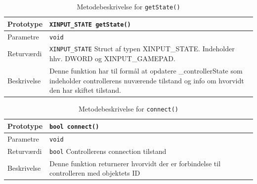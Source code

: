 \begin{table}[h]
\begin{tabularx}{\textwidth}{| L{2.5 cm} | Z |} \hline
Prototype 	& \texttt{XINPUT\_STATE getState()} \\\hline
Parametre 	& \texttt{void}				\newline \\\hline
Returværdi	& \texttt{XINPUT\_STATE} 	\newline Struct af typen XINPUT\_STATE. Indeholder hhv. DWORD og XINPUT\_GAMEPAD. \\\hline
Beskrivelse	& Denne funktion har til formål at opdatere \_controllerState som indeholder controllerens nuværende tilstand og info om hvorvidt den har skiftet tilstand. \\\hline
\end{tabularx}
\caption{Metodebeskrivelse for \texttt{getState()}}
\label{table:met_getstate}
\end{table}

\begin{table}[h]
\begin{tabularx}{\textwidth}{| L{2.5 cm} | Z |} \hline
Prototype 	& \texttt{bool connect()} \\\hline
Parametre 	& \texttt{void}				\newline \\\hline
Returværdi	& \texttt{bool} 			\newline Controllerens connection tilstand \\\hline
Beskrivelse	&  Denne funktion returnerer hvorvidt der er forbindelse til controlleren med objektets ID \\\hline
\end{tabularx}
\caption{Metodebeskrivelse for \texttt{connect()}}
\label{table:met_connect}
\end{table}

\clearpage

